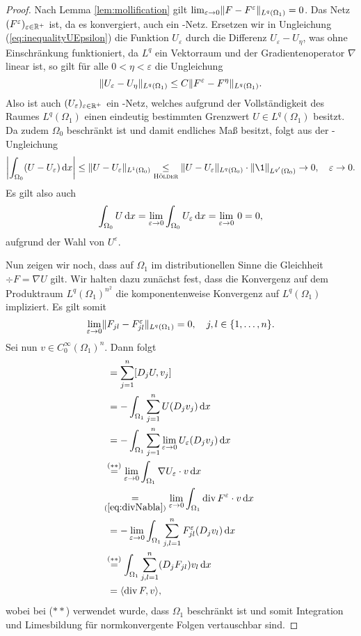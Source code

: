 \begin{proof}
  Nach Lemma \ref{lem:mollification} gilt $\lim_{\varepsilon \to 0} \lVert F - F^\varepsilon \rVert_{L^q(\Omega_1)} = 0$.
  Das Netz $(F^\varepsilon)_{\varepsilon \in \mathbb{R}^+}$ ist, da es konvergiert, auch ein \cauchy-Netz.
  Ersetzen wir in Ungleichung (\ref{eq:inequalityUEpsilon}) die Funktion $U_\varepsilon$ durch die Differenz $U_\varepsilon - U_\eta$, was ohne Einschränkung funktioniert, da $L^q$ ein Vektorraum und der Gradientenoperator $\nabla$ linear ist, so gilt für alle $0 < \eta < \varepsilon$ die Ungleichung
  $$
    \lVert U_\varepsilon - U_\eta \rVert_{L^q(\Omega_1)}
    \leq C \lVert F^\varepsilon - F^\eta \rVert_{L^q(\Omega_1)}.
  $$
  Also ist auch $(U_\varepsilon)_{\varepsilon \in \mathbb{R}^+}$ ein \cauchy-Netz, welches aufgrund der Vollständigkeit des Raumes $L^q(\Omega_1)$ einen eindeutig bestimmten Grenzwert $U \in L^q(\Omega_1)$ besitzt.
  Da zudem $\Omega_0$ beschränkt ist und damit endliches Maß besitzt, folgt aus der \hoelder\hyp{}Ungleichung
  $$
    \left| \int_{\Omega_0} (U - U_\varepsilon) \d x \right|
    \leq  \norm{U - U_\varepsilon}_{L^1(\Omega_0)} 
    \underset{\hoelder}{\leq} \norm{U - U_\varepsilon}_{L^q(\Omega_0)}\cdot \norm{\1}_{L^{q'}(\Omega_0)}
    \to 0, \quad \varepsilon \to 0.
  $$
  Es gilt also auch
  $$
  \int_{\Omega_0} U \, {\operatorname{d}\!{x}} 
  = \lim_{\varepsilon \to 0} \int_{\Omega_0} U_\varepsilon \, {\operatorname{d}\!{x}} 
  = \lim_{\varepsilon \to 0}\, 0 =  0,
  $$
  aufgrund der Wahl von $U^\varepsilon$.

  Nun zeigen wir noch, dass auf $\Omega_1$ im distributionellen Sinne die Gleichheit $\div F = \nabla U$ gilt. 
  Wir halten dazu zunächst fest, dass die Konvergenz auf dem Produktraum $L^q(\Omega_1)^{n^2}$ die komponentenweise Konvergenz auf $L^q(\Omega_1)$ impliziert.
  Es gilt somit 
  $$
  \lim_{\varepsilon \to 0} \lVert F_{jl} - F_{jl}^\varepsilon \rVert_{L^q(\Omega_1)} = 0, \quad j,l \in \{ 1,\dots,n\}. 
  $$ 
  Sei nun $v \in C_0^\infty(\Omega_1)^n$.
  Dann folgt
  \begin{align*}
    [\nabla U, v]
    &= \sum_{j = 1}^n [D_jU, v_j]\\
    &= -\int_{\Omega_1} \sum_{j = 1}^n U (D_j v_j) \d x \\ 
    &= -\int_{\Omega_1} \sum_{j = 1}^n \lim_{\varepsilon \to 0} U_\varepsilon (D_j v_j) \d x \\
    &\hspace{-0.10cm}\overset{(\ast\ast)}{=} \lim_{\varepsilon \to 0} \int_{\Omega_1} \nabla U_\varepsilon \cdot v \d x \\
    &\hspace{-0.21cm}\underset{(\ref{eq:divNabla})}{=} \lim_{\varepsilon \to 0} \int_{\Omega_1} \div F^\varepsilon \cdot v \d x \\
    &= -\lim_{\varepsilon \to 0} \int_{\Omega_1} \sum_{j,l=1}^n F_{jl}^\varepsilon (D_j v_l) \d x \\
    &\hspace{-0.10cm}\overset{(\ast\ast)}{=} \int_{\Omega_1} \sum_{j,l=1}^n (D_j F_{jl}) v_l \d x \\
    &= \langle \div F, v \rangle,
  \end{align*}
  wobei bei ($\ast\ast$) verwendet wurde, dass $\Omega_1$ beschränkt ist und somit Integration und Limesbildung für normkonvergente Folgen vertauschbar sind.


\end{proof}
